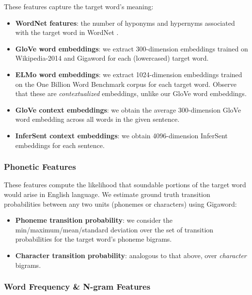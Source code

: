 \documentclass{dcthesis}
\theoremstyle{definition}
\theoremstyle{remark}
\begin{document}
\label{sec:semantic_features} These features capture the target word's meaning:

\begin{itemize}
  \item \textbf{WordNet features}: the number of hyponyms and hypernyms associated with the target word in WordNet \citep{fellbaum2010wordnet}.
  \item \textbf{GloVe word embeddings}: we extract 300-dimension embeddings trained on Wikipedia-2014 and Gigaword \citep{pennington2014glove} for each (lowercased) target word. 
  \item \textbf{ELMo word embeddings}: we extract 1024-dimension embeddings trained on the One Billion Word Benchmark corpus \citep{peters2018deep} for each target word. Observe that these are \textit{contextualized} embeddings, unlike our GloVe word embeddings. 
  \item \textbf{GloVe context embeddings}: we obtain the average 300-dimension GloVe word embedding across all words in the given sentence.
  \item \textbf{InferSent context embeddings}: we obtain 4096-dimension InferSent embeddings \citep{conneau2017supervised} for each sentence.
\end{itemize}

\subsubsection{Phonetic Features}

These features compute the likelihood that soundable portions of the target word would arise in English language. We estimate ground truth transition probabilities between any two units (phonemes or characters) using Gigaword:

\begin{itemize}
  \item \textbf{Phoneme transition probability}: we consider the min/maximum/mean/standard deviation over the set of transition probabilities for the target word's phoneme bigrams. 
  \item \textbf{Character transition probability}: analogous to that above, over \textit{character} bigrams.
\end{itemize}

\subsubsection{Word Frequency \& N-gram Features}
\end{document}
